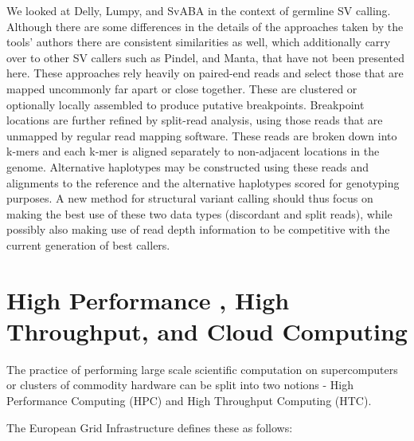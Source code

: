 We looked at Delly, Lumpy, and SvABA in the context of germline SV calling. Although there are some differences in the details of the approaches taken by the tools' authors there are consistent similarities as well, which additionally carry over to other SV callers such as Pindel\autocite{ye2009pindel}, and Manta\autocite{chen2015manta}, that have not been presented here. These approaches rely heavily on paired-end reads and select those that are mapped uncommonly far apart or close together. These are clustered or optionally locally assembled to produce putative breakpoints. Breakpoint locations are further refined by split-read analysis, using those reads that are unmapped by regular read mapping software. These reads are broken down into k-mers and each k-mer is aligned separately to non-adjacent locations in the genome. Alternative haplotypes may be constructed using these reads and alignments to the reference and the alternative haplotypes scored for genotyping purposes. A new method for structural variant calling should thus focus on making the best use of these two data types (discordant and split reads), while possibly also making use of read depth information to be competitive with the current generation of best callers. 

\section{High Performance , High Throughput, and Cloud Computing}

The practice of performing large scale scientific computation on supercomputers or clusters of commodity hardware can be split into two notions - High Performance Computing (HPC) and High Throughput Computing (HTC).

The European Grid Infrastructure defines these as follows\autocite{Glossary_V1_-_EGIWiki_2016-10-28}:



